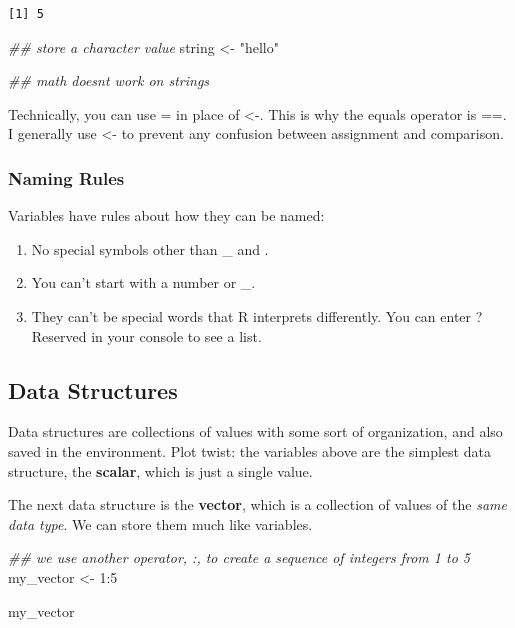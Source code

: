 \documentclass[
  letterpaper,
  DIV=11,
  numbers=noendperiod]{scrreprt}
\newenvironment{Shaded}{\begin{snugshade}}{\end{snugshade}}
\newcommand{\DecValTok}[1]{\textcolor[rgb]{0.68,0.00,0.00}{#1}}
\newcommand{\DocumentationTok}[1]{\textcolor[rgb]{0.37,0.37,0.37}{\textit{#1}}}
\newcommand{\NormalTok}[1]{\textcolor[rgb]{0.00,0.23,0.31}{#1}}
\newcommand{\OtherTok}[1]{\textcolor[rgb]{0.00,0.23,0.31}{#1}}
\newcommand{\SpecialCharTok}[1]{\textcolor[rgb]{0.37,0.37,0.37}{#1}}
\newcommand{\StringTok}[1]{\textcolor[rgb]{0.13,0.47,0.30}{#1}}
\providecommand{\tightlist}{%
  \setlength{\itemsep}{0pt}\setlength{\parskip}{0pt}}\usepackage{longtable,booktabs,array}
\begin{document}
\begin{verbatim}
[1] 5
\end{verbatim}

\begin{Shaded}
\begin{Highlighting}[]
\DocumentationTok{\#\# store a character value}
\NormalTok{string }\OtherTok{\textless{}{-}} \StringTok{"hello"}

\DocumentationTok{\#\# math doesn\textquotesingle{}t work on strings}
\end{Highlighting}
\end{Shaded}

Technically, you can use = in place of \textless-. This is why the
equals operator is ==. I generally use \textless- to prevent any
confusion between assignment and comparison.

\subsubsection{Naming Rules}\label{naming-rules}

Variables have rules about how they can be named:

\begin{enumerate}
\def\labelenumi{\arabic{enumi}.}
\tightlist
\item
  No special symbols other than \_ and .
\item
  You can't start with a number or \_.
\item
  They can't be special words that R interprets differently. You can
  enter ?Reserved in your console to see a list.
\end{enumerate}

\subsection{Data Structures}\label{data-structures}

Data structures are collections of values with some sort of
organization, and also saved in the environment. Plot twist: the
variables above are the simplest data structure, the \textbf{scalar},
which is just a single value.

The next data structure is the \textbf{vector}, which is a collection of
values of the \emph{same data type}. We can store them much like
variables.

\begin{Shaded}
\begin{Highlighting}[]
\DocumentationTok{\#\# we use another operator, :, to create a sequence of integers from 1 to 5}
\NormalTok{my\_vector }\OtherTok{\textless{}{-}} \DecValTok{1}\SpecialCharTok{:}\DecValTok{5}

\NormalTok{my\_vector}
\end{Highlighting}
\end{Shaded}
\end{document}
